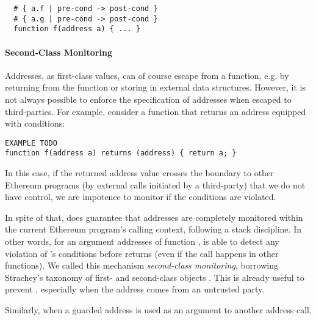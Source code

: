 
\begin{lstlisting}
  # { a.f | pre-cond -> post-cond }
  # { a.g | pre-cond -> post-cond }
  function f(address a) { ... }
\end{lstlisting}

\fi

\paragraph{Second-Class Monitoring}
Addresses, as first-class values, can of course escape from a function, e.g.
by returning from the function or storing in external data structures.
However, it is not always possible to enforce the specification
of addresses when escaped to third-parties.
For example, consider a function that returns an address equipped with
conditions:
\begin{lstlisting}
EXAMPLE TODO
function f(address a) returns (address) { return a; }
\end{lstlisting}
In this case, if the returned address value crosses the boundary to other
Ethereum programs (by external calls initiated by a third-party) that we do not
have control, we are impotence to monitor if the conditions are violated.

In spite of that, \lang does guarantee that addresses are completely monitored
within the current Ethereum program's calling context, following a stack
discipline.
In other words, for an argument addresses  of function ,
\lang is able to detect any violation of 's conditions before
 returns (even if the call happens in other functions).
We called this mechanism \emph{second-class monitoring}, borrowing Strachey's taxonomy
of first- and second-class objects \cite{DBLP:journals/lisp/Strachey00}.
This is already useful to prevent  , especially when
the address comes from an untrusted party.

Similarly, when a guarded address is used as an argument to another address
call, 

